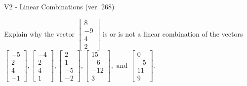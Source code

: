 \begin{exercise}
  \begin{exerciseTitle}V2 - Linear Combinations (ver. 268)\end{exerciseTitle}
  \begin{exerciseStatement}
    Explain why the vector \(\left[\begin{array}{c}
8 \\
-9 \\
4 \\
2
\end{array}\right]\)  is or is not a linear 
	combination of the vectors \(\left[\begin{array}{c}
-5 \\
2 \\
4 \\
-1
\end{array}\right] , \left[\begin{array}{c}
-4 \\
2 \\
4 \\
1
\end{array}\right] , \left[\begin{array}{c}
2 \\
1 \\
-5 \\
-2
\end{array}\right] , \left[\begin{array}{c}
15 \\
-6 \\
-12 \\
3
\end{array}\right] , \text{ and } \left[\begin{array}{c}
0 \\
-5 \\
11 \\
9
\end{array}\right]\).
	



\end{exerciseStatement}
\end{exercise}
